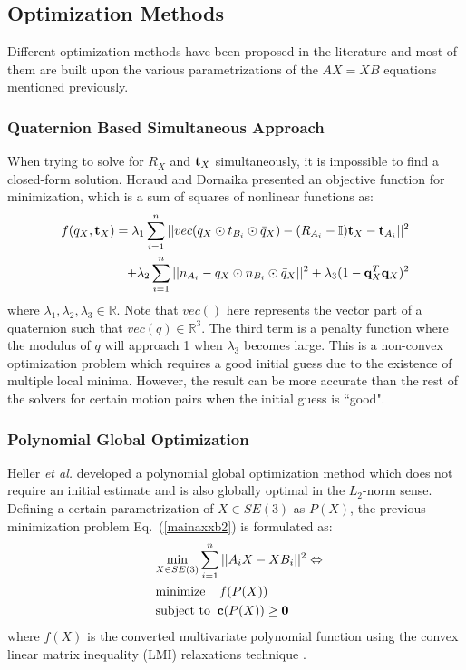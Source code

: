 \documentclass[twocolumn,10pt]{asme2ej}
\newcommand{\ttt}{{\bf t}}
\newcommand{\qq}{{\bf q}}
\begin{document}
\subsection{Optimization Methods}
\label{sec:optimization}
Different optimization methods have been proposed in the literature and most of them are built upon the various parametrizations of the $AX=XB$ equations mentioned previously. 
\subsubsection{Quaternion Based Simultaneous Approach}
When trying to solve for $R_{X}$ and $\ttt_{X}$ simultaneously, it is impossible to find a closed-form solution. Horaud and Dornaika \cite{horaud1995hand} presented an objective function for minimization, which is a sum of squares of nonlinear functions as:
\begin{equation}
\begin{split}
f(q_X,\ttt_{X}) = \lambda_{1} \sum_{i = 1}^{n}||vec(q_{X} \odot t_{B_{i}} \odot \bar{q}_{X}) -(R_{A_i} - \mathbb{I})\ttt_{X} - \ttt_{A_i}||^{2}\\
+ \lambda_{2} \sum_{i = 1}^{n}||{n_{A_{i}} - q_{X} \odot n_{B_{i}} \odot \bar{q}_{X}}||^{2} + \lambda_{3}(1 - \qq_{X}^{T}\qq_{X})^2
\end{split}
\label{simlqua}
\end{equation}
where $\lambda_1, \lambda_2, \lambda_3 \in \mathbb{R}$. Note that $vec()$ here represents the vector part of a quaternion such that $vec(q) \in \mathbb{R}^{3}$. The third term is a penalty function where the modulus %
of $q$ will approach 1 when $\lambda_{3}$ becomes large. This is a non-convex optimization problem which requires a good initial guess due to the existence of multiple local minima. However, the result can be more accurate than the rest of the solvers for certain motion pairs when the initial guess is ``good".

\subsubsection{Polynomial Global Optimization}
Heller {\it et al.} \cite{heller2014hand} developed a polynomial global optimization method which does not require an initial estimate and is also globally optimal in the $L_2$-norm sense. Defining a certain parametrization of $X \in SE(3)$ as $P(X)$, the previous minimization problem Eq.~(\ref{mainaxxb2}) is formulated as:
\begin{equation}
\begin{split}
&\underset{X \in SE(3)}{\text{min}}\sum_{i=1}^n ||A_{i}X - XB_{i}||^2 \Leftrightarrow \\
&\text{minimize} \; \; \; \; f(P(X)) \\
\; \; &\text{subject to} \; \; {\bf c}(P(X)) \geq {\bf 0} 
\end{split}
\label{LMI}
\end{equation}
where $f(X)$ is the converted multivariate polynomial function using the convex linear matrix inequality (LMI) relaxations technique \cite{lepetit2009epnp}. 
\end{document}
